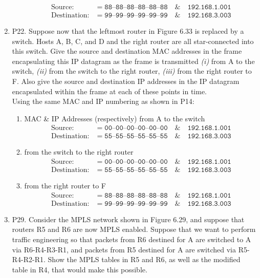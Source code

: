 \documentclass[12pt]{article}
\begin{document}
\begin{enumerate}
\begin{enumerate}[label= (\roman{*})]
\begin{align*}
            \text{Source:} &=\texttt{88--88--88--88--88--88}\quad \& \quad \texttt{192.168.1.001}\\
            \text{Destination:} &=\texttt{99--99--99--99--99--99}\quad \&\quad\texttt{192.168.3.003}
        \end{align*}
    \end{enumerate}
    \item P22. Suppose now that the leftmost router in Figure 6.33 is replaced by a switch. Hosts A, B, C, and D and the right router are all star-connected into this switch. Give the source and destination MAC addresses in the frame encapsulating this IP datagram as the frame is transmitted \textit{(i)} from A to the switch, \textit{(ii)} from the switch to the right router, \textit{(iii)} from the right router to F. Also give the source and destination IP addresses in the IP datagram encapsulated within the frame at each of these points in time.\\[1em]
    Using the same MAC and IP numbering as shown in P14:
    \begin{enumerate}[label= (\roman{*})]
        \item MAC \& IP Addresses (respectively) from A to the switch
        \begin{align*}
            \text{Source:} &=\texttt{00--00--00--00--00--00}\quad \& \quad \texttt{192.168.1.001}\\
            \text{Destination:} &=\texttt{55--55--55--55--55--55}\quad \&\quad\texttt{192.168.3.003}
        \end{align*}
        \item from the switch to the right router
        \begin{align*}
            \text{Source:} &=\texttt{00--00--00--00--00--00}\quad \& \quad \texttt{192.168.1.001}\\
            \text{Destination:} &=\texttt{55--55--55--55--55--55}\quad \&\quad\texttt{192.168.3.003}
        \end{align*}
        \item from the right router to F
        \begin{align*}
            \text{Source:} &=\texttt{88--88--88--88--88--88}\quad \& \quad \texttt{192.168.1.001}\\
            \text{Destination:} &=\texttt{99--99--99--99--99--99}\quad \&\quad\texttt{192.168.3.003}
        \end{align*}
    \end{enumerate}
    \item P29. Consider the MPLS network shown in Figure 6.29, and suppose that routers R5 and R6 are now MPLS enabled. Suppose that we want to perform traffic engineering so that packets from R6 destined for A are switched to A via R6-R4-R3-R1, and packets from R5 destined for A are switched via R5-R4-R2-R1. Show the MPLS tables in R5 and R6, as well as the modified table in R4, that would make this possible.

\end{enumerate}
\end{document}
